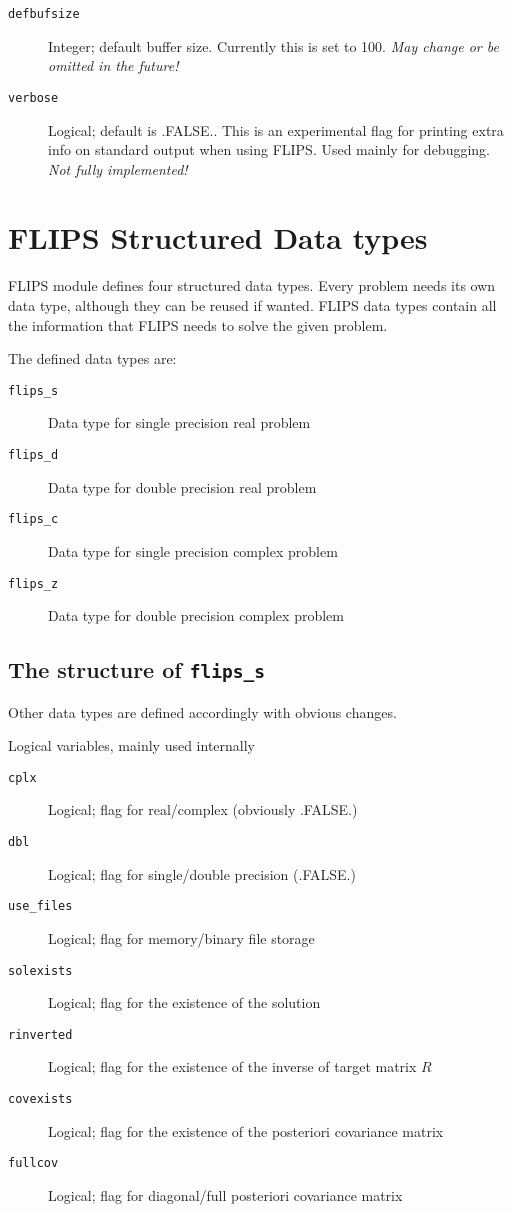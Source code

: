 \documentclass[a4paper,twoside]{refrep}
\newcommand{\aitem}[1]{\item[{\tt #1}]}
\newenvironment{arglist}
	{\begin{description}}
	{\end{description}}
\begin{document}
\vspace*{12pt}

\begin{arglist}
\aitem{defbufsize} Integer; default buffer size. Currently this is set to 100. \emph{May change or be omitted in the future!}
\aitem{verbose} Logical; default is .FALSE.. This is an experimental flag for printing extra info on standard output when using FLIPS. Used mainly for debugging. \emph{Not fully implemented!}
\end{arglist}



\chapter{FLIPS Structured Data types}
FLIPS module defines four structured data types. Every problem needs its own data type, although they can be reused if wanted. FLIPS data types contain all the information that FLIPS needs to solve the given problem.

The defined data types are:
\begin{arglist}
\aitem{flips\_s} Data type for single precision real problem
\aitem{flips\_d} Data type for double precision real problem
\aitem{flips\_c} Data type for single precision complex problem
\aitem{flips\_z} Data type for double precision complex problem
\end{arglist}

\section*{The structure of {\tt flips\_s}}
Other data types are defined accordingly with obvious changes.

 Logical variables, mainly used internally

\begin{arglist}
\aitem{cplx} Logical; flag for real/complex (obviously .FALSE.)
\aitem{dbl} Logical; flag for single/double precision (.FALSE.)
\aitem{use\_files} Logical; flag for memory/binary file storage
\aitem{solexists} Logical; flag for the existence of the solution
\aitem{rinverted} Logical; flag for the existence of the inverse of target matrix $R$
\aitem{covexists} Logical; flag for the existence of the posteriori covariance matrix
\aitem{fullcov} Logical; flag for diagonal/full posteriori covariance matrix
\end{arglist}
\end{document}

